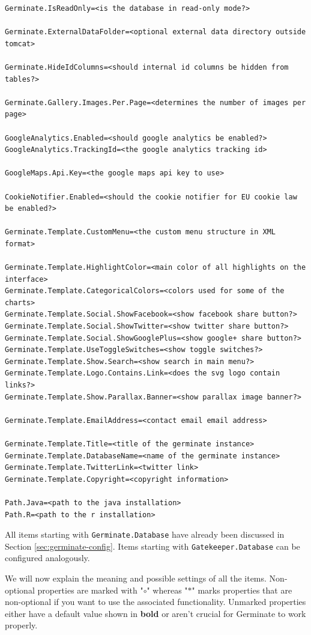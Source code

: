 \begin{lstlisting}[style=Properties]
Germinate.IsReadOnly=<is the database in read-only mode?>

Germinate.ExternalDataFolder=<optional external data directory outside tomcat>

Germinate.HideIdColumns=<should internal id columns be hidden from tables?>

Germinate.Gallery.Images.Per.Page=<determines the number of images per page>

GoogleAnalytics.Enabled=<should google analytics be enabled?>
GoogleAnalytics.TrackingId=<the google analytics tracking id>

GoogleMaps.Api.Key=<the google maps api key to use>

CookieNotifier.Enabled=<should the cookie notifier for EU cookie law be enabled?>

Germinate.Template.CustomMenu=<the custom menu structure in XML format>

Germinate.Template.HighlightColor=<main color of all highlights on the interface>
Germinate.Template.CategoricalColors=<colors used for some of the charts>
Germinate.Template.Social.ShowFacebook=<show facebook share button?>
Germinate.Template.Social.ShowTwitter=<show twitter share button?>
Germinate.Template.Social.ShowGooglePlus=<show google+ share button?>
Germinate.Template.UseToggleSwitches=<show toggle switches?>
Germinate.Template.Show.Search=<show search in main menu?>
Germinate.Template.Logo.Contains.Link=<does the svg logo contain links?>
Germinate.Template.Show.Parallax.Banner=<show parallax image banner?>

Germinate.Template.EmailAddress=<contact email email address>

Germinate.Template.Title=<title of the germinate instance>
Germinate.Template.DatabaseName=<name of the germinate instance>
Germinate.Template.TwitterLink=<twitter link>
Germinate.Template.Copyright=<copyright information>

Path.Java=<path to the java installation>
Path.R=<path to the r installation>
\end{lstlisting}
\noindent
All items starting with \texttt{Germinate.Database} have already been discussed in Section \ref{sec:germinate-config}. Items starting with \texttt{Gatekeeper.Database} can be configured analogously.

We will now explain the meaning and possible settings of all the items. Non-optional properties are marked with "$\circ$" whereas "$*$" marks properties that are non-optional if you want to use the associated functionality. Unmarked properties either have a default value shown in \textbf{bold} or aren't crucial for Germinate to work properly.

